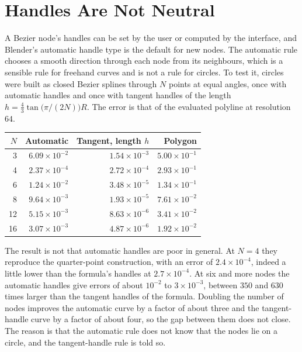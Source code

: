 \section{Handles Are Not Neutral}

A Bezier node's handles can be set by the user or computed by the interface, and Blender's automatic handle type is the default for new nodes. The automatic rule chooses a smooth direction through each node from its neighbours, which is a sensible rule for freehand curves and is not a rule for circles. To test it, circles were built as closed Bezier splines through $N$ points at equal angles, once with automatic handles and once with tangent handles of the length $h=\tfrac43\tan\bigl(\pi/(2N)\bigr)R$. The error is that of the evaluated polyline at resolution $64$.

\begin{center}
\begin{tabular}{rrrr}
\toprule
$N$ & Automatic & Tangent, length $h$ & Polygon\\
\midrule
3 & $6.09\times10^{-2}$ & $1.54\times10^{-3}$ & $5.00\times10^{-1}$\\
4 & $2.37\times10^{-4}$ & $2.72\times10^{-4}$ & $2.93\times10^{-1}$\\
6 & $1.24\times10^{-2}$ & $3.48\times10^{-5}$ & $1.34\times10^{-1}$\\
8 & $9.64\times10^{-3}$ & $1.93\times10^{-5}$ & $7.61\times10^{-2}$\\
12 & $5.15\times10^{-3}$ & $8.63\times10^{-6}$ & $3.41\times10^{-2}$\\
16 & $3.07\times10^{-3}$ & $4.87\times10^{-6}$ & $1.92\times10^{-2}$\\
\bottomrule
\end{tabular}
\end{center}

The result is not that automatic handles are poor in general. At $N=4$ they reproduce the quarter-point construction, with an error of $2.4\times10^{-4}$, indeed a little lower than the formula's handles at $2.7\times10^{-4}$. At six and more nodes the automatic handles give errors of about $10^{-2}$ to $3\times10^{-3}$, between $350$ and $630$ times larger than the tangent handles of the formula. Doubling the number of nodes improves the automatic curve by a factor of about three and the tangent-handle curve by a factor of about four, so the gap between them does not close. The reason is that the automatic rule does not know that the nodes lie on a circle, and the tangent-handle rule is told so.


